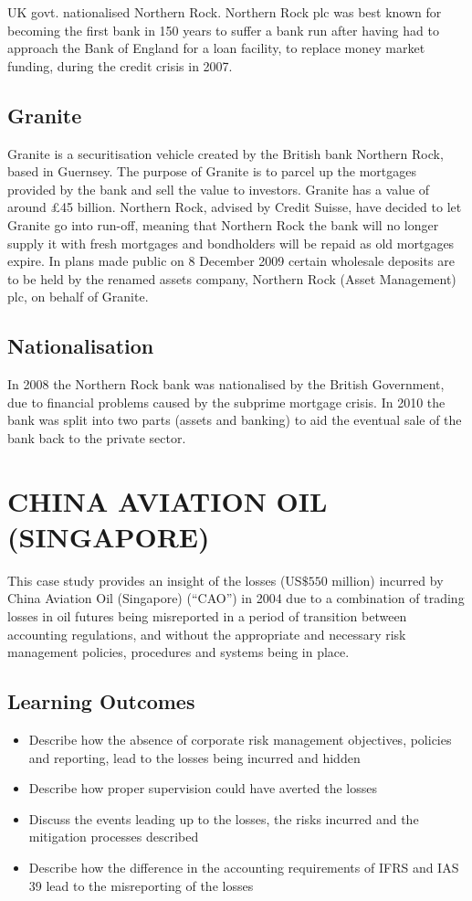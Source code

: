 \documentclass[]{article}
\begin{document}
UK govt. nationalised Northern Rock.
Northern Rock plc was best known for becoming the first bank in 150 years to suffer a bank run after having had to approach the Bank of England for a loan facility, to replace money market funding, during the credit crisis in 2007.



\subsection*{Granite}
Granite is a securitisation vehicle created by the British bank Northern Rock, based in Guernsey.
The purpose of Granite is to parcel up the mortgages provided by the bank and sell the value to investors. Granite has a value of around £45 billion.
Northern Rock, advised by Credit Suisse, have decided to let Granite go into run-off, meaning that Northern Rock the bank will no longer supply it with fresh mortgages and bondholders will be repaid as old mortgages expire.
In plans made public on 8 December 2009 certain wholesale deposits are to be held by the renamed assets company, Northern Rock (Asset Management) plc, on behalf of Granite.

\subsection*{Nationalisation}
In 2008 the Northern Rock bank was nationalised by the British Government, due to financial problems caused by the subprime mortgage crisis. In 2010 the bank was split into two parts (assets and banking) to aid the eventual sale of the bank back to the private sector.

\newpage
\section{CHINA AVIATION OIL (SINGAPORE)}

This case study provides an insight of the losses (US$\$550$ million) incurred by China Aviation Oil (Singapore)
(“CAO”) in 2004 due to a combination of trading losses in oil futures being misreported in a period of transition
between accounting regulations, and without the appropriate and necessary risk management policies, procedures
and systems being in place.

\subsection{Learning Outcomes}
\begin{itemize}
\item Describe how the absence of corporate risk management objectives, policies
and reporting, lead to the losses being incurred and hidden
\item Describe how proper supervision could have averted the losses
\item  Discuss the events leading up to the losses, the risks incurred and the
mitigation processes described
\item  Describe how the difference in the accounting requirements of IFRS and IAS
39 lead to the misreporting of the losses
\end{itemize}
\end{document}
